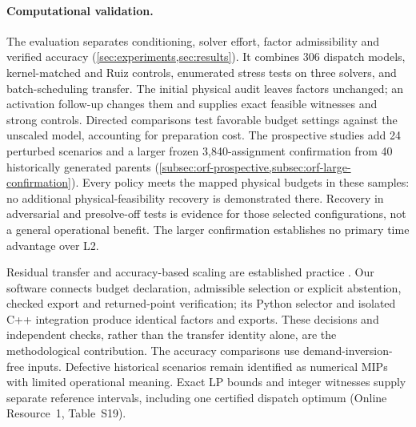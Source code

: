 \paragraph{Computational validation.}
The evaluation separates conditioning, solver effort, factor admissibility and
verified accuracy (\cref{sec:experiments,sec:results}). It combines 306 dispatch
models, kernel-matched and Ruiz controls, enumerated stress tests on three
solvers, and batch-scheduling transfer. The initial physical audit leaves factors
unchanged; an activation follow-up changes them and supplies exact feasible
witnesses and strong controls. Directed comparisons test favorable budget
settings against the unscaled model, accounting for preparation cost.
The prospective studies add 24 perturbed scenarios and a larger frozen
3,840-assignment confirmation from 40 historically generated parents
(\cref{subsec:orf-prospective,subsec:orf-large-confirmation}). Every policy meets
the mapped physical budgets in these samples: no additional physical-feasibility
recovery is demonstrated there. Recovery in adversarial and presolve-off tests
is evidence for those selected configurations, not a general operational benefit.
The larger confirmation establishes no primary time advantage over L2.

Residual transfer and accuracy-based scaling are established practice
\cite{gurobiExternalScaling,pritchett2017scaling}. Our software connects budget
declaration, admissible selection or explicit abstention, checked export and
returned-point verification; its Python selector and isolated C++ integration
produce identical factors and exports. These decisions and independent checks,
rather than the transfer identity alone, are the methodological contribution.
The accuracy comparisons use demand-inversion-free inputs. Defective historical
scenarios remain identified as numerical MIPs with limited operational meaning.
Exact LP bounds and integer witnesses supply separate reference intervals,
including one certified dispatch optimum (Online Resource~1, Table~S19).
